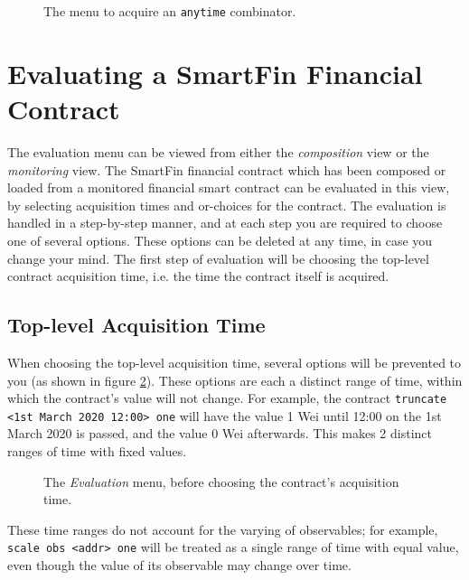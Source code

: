 \documentclass{article}
\begin{document}
\begin{figure}[h]
    \centering
    \caption{The menu to acquire an \texttt{anytime} combinator.}
    \label{UG:fig:monitoring-anytime-acquire}
\end{figure}


\section{Evaluating a SmartFin Financial Contract} \label{UG:evaluating}

The evaluation menu can be viewed from either the \textit{composition} view or the \textit{monitoring} view. The SmartFin financial contract which has been composed or loaded from a monitored financial smart contract can be evaluated in this view, by selecting acquisition times and or-choices for the contract. The evaluation is handled in a step-by-step manner, and at each step you are required to choose one of several options. These options can be deleted at any time, in case you change your mind. The first step of evaluation will be choosing the top-level contract acquisition time, i.e. the time the contract itself is acquired.


\subsection{Top-level Acquisition Time}

When choosing the top-level acquisition time, several options will be prevented to you (as shown in figure \ref{UG:fig:eval-time-unselected}). These options are each a distinct range of time, within which the contract's value will not change. For example, the contract \texttt{truncate <1st March 2020 12:00> one} will have the value 1 Wei until 12:00 on the 1st March 2020 is passed, and the value 0 Wei afterwards. This makes 2 distinct ranges of time with fixed values. \\

\begin{figure}[h]
    \centering
    \caption{The \textit{Evaluation} menu, before choosing the contract's acquisition time.}
    \label{UG:fig:eval-time-unselected}
\end{figure}

These time ranges do not account for the varying of observables; for example, \texttt{scale obs <addr> one} will be treated as a single range of time with equal value, even though the value of its observable may change over time.
\end{document}

